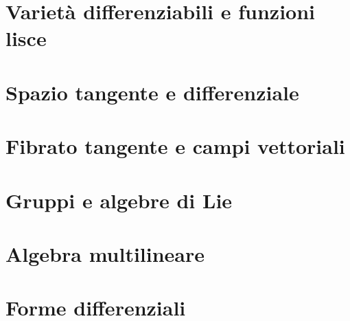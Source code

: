 


    \section{Varietà differenziabili e funzioni lisce}
       

    \section{Spazio tangente e differenziale}
       

    \section{Fibrato tangente e campi vettoriali}
       

    \section{Gruppi e algebre di Lie}
       

    \section{Algebra multilineare}
       

    \section{Forme differenziali}
       


